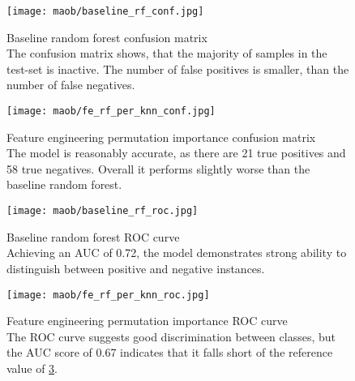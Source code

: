 \begin{figure}[H]
    \begin{center}
        \captionsetup{justification=centering}
        \texttt{[image: maob/baseline\_rf\_conf.jpg]}
        \caption[]{Baseline random forest confusion matrix\\
            The confusion matrix shows, that the majority of samples in the test-set is inactive. The number of false positives is smaller, than the number of false negatives.
        }
        \label{fig:maob_baseline_rf_conf}
    \end{center}
\end{figure}
\begin{figure}[H]
    \begin{center}
        \captionsetup{justification=centering}
        \texttt{[image: maob/fe\_rf\_per\_knn\_conf.jpg]}
        \caption[]{Feature engineering permutation importance confusion matrix\\
            The model is reasonably accurate, as there are 21 true positives and 58 true negatives. Overall it performs slightly worse than the baseline random forest.
        }
        \label{fig:maob_fe_rf_per_knn_conf}
    \end{center}

\end{figure}
\begin{figure}[H]
    \begin{center}
        \captionsetup{justification=centering}
        \texttt{[image: maob/baseline\_rf\_roc.jpg]}
        \caption[]{Baseline random forest ROC curve\\
            Achieving an AUC of 0.72, the model demonstrates strong ability to distinguish between positive and negative instances.
        }
        \label{fig:maob_baseline_rf_roc}
    \end{center}

\end{figure}

\begin{figure}[H]
    \begin{center}
        \captionsetup{justification=centering}
        \texttt{[image: maob/fe\_rf\_per\_knn\_roc.jpg]}
        \caption[]{Feature engineering permutation importance ROC curve\\
            The ROC curve suggests good discrimination between classes, but the AUC score of 0.67 indicates that it falls short of the reference value of \ref*{fig:maob_baseline_rf_roc}.
        }
        \label{fig:maob_fe_rf_per_knn_roc}
    \end{center}
\end{figure}
